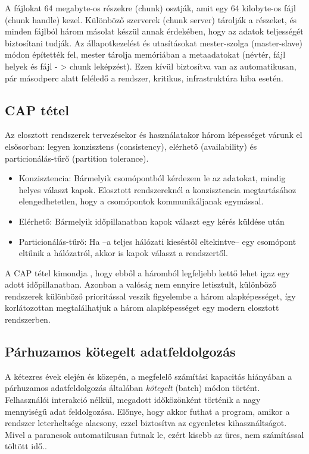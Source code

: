 \documentclass[a4paper,12pt]{article}
\begin{document}
A fájlokat 64 megabyte-os részekre (chunk) osztják, amit egy 64 kilobyte-os fájl (chunk handle) kezel. Különböző szerverek (chunk server) tárolják a részeket, és minden fájlból három másolat készül annak érdekében, hogy az adatok teljességét biztosítani tudják. Az állapotkezelést és utasításokat mester-szolga (master-slave) módon építették fel, mester tárolja memóriában a metaadatokat (névtér, fájl helyek és fájl - > chunk leképzést). Ezen kívül biztosítva van az automatikusan, pár másodperc alatt feléledő a rendszer, kritikus, infrastruktúra hiba esetén.

\subsection{CAP tétel}
Az elosztott rendszerek tervezésekor és használatakor három képességet várunk el elsősorban: legyen konzisztens (consistency), elérhető (availability) és particionálás-tűrő (partition tolerance). 
\begin{itemize}
\item Konzisztencia: Bármelyik csomópontból kérdezem le az adatokat, mindig helyes választ kapok. Elosztott rendszereknél a konzisztencia megtartásához elengedhetetlen, hogy a csomópontok kommunikáljanak egymással. 
\item Elérhető: Bármelyik időpillanatban kapok választ egy kérés küldése után
\item Particionálás-tűrő: Ha --a teljes hálózati kieséstől eltekintve-- egy csomópont eltűnik a hálózatról, akkor is kapok választ a rendszertől.
\end{itemize}
A CAP tétel kimondja \cite{cap}, hogy ebből a háromból legfeljebb kettő lehet igaz egy adott időpillanatban. Azonban a valóság nem ennyire letisztult, különböző rendszerek különböző prioritással veszik figyelembe a három alapképességet, így korlátozottan megtalálhatjuk a három alapképességet egy modern elosztott rendszerben. \cite{ecap}

\subsection{Párhuzamos kötegelt adatfeldolgozás}
A kétezres évek elején és közepén, a megfelelő számítási kapacitás hiányában a párhuzamos adatfeldolgozás általában \textsl{kötegelt} (batch) módon történt. Felhasználói interakció nélkül, megadott időközönként történik a nagy mennyiségű adat feldolgozása. Előnye, hogy akkor futhat a program, amikor a rendszer leterheltsége alacsony, ezzel biztosítva az egyenletes kihasználtságot. Mivel a parancsok automatikusan futnak le, ezért kisebb az üres, nem számítással töltött idő.\cite{batch}.
\end{document}
